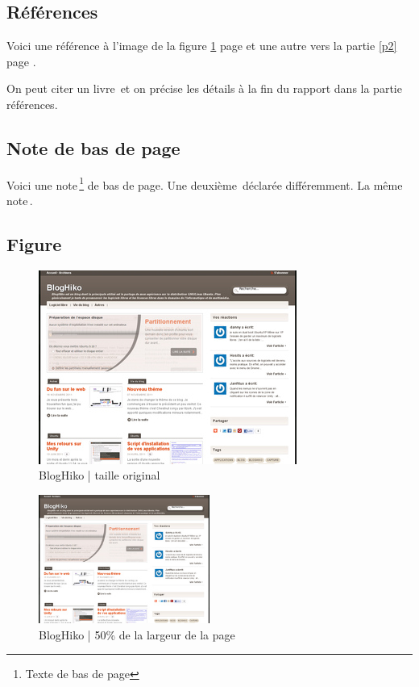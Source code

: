\subsection{Références}

Voici une référence à l'image de la figure \ref{bloghiko} page \pageref{bloghiko} et une autre vers la partie \ref{p2} page \pageref{p2}.

On peut citer un livre\, et on précise les détails à la fin du rapport dans la partie références.


\subsection{Note de bas de page}

Voici une note\,\footnote{Texte de bas de page} de bas de page.
Une deuxième\,\footnotemark{} déclarée différemment.
La même note\,\footnotemark[\value{footnote}].



\subsection{Figure}

\begin{figure}[!ht]
    \center
    \includegraphics[]{./images/bloghiko.jpg}
    \caption{BlogHiko | taille original}
    \label{bloghiko}
\end{figure}

\begin{figure}[H]
    \center
    \includegraphics[width=0.5\textwidth]{./images/bloghiko.jpg}
    \caption{BlogHiko | 50\% de la largeur de la page}
\end{figure}


